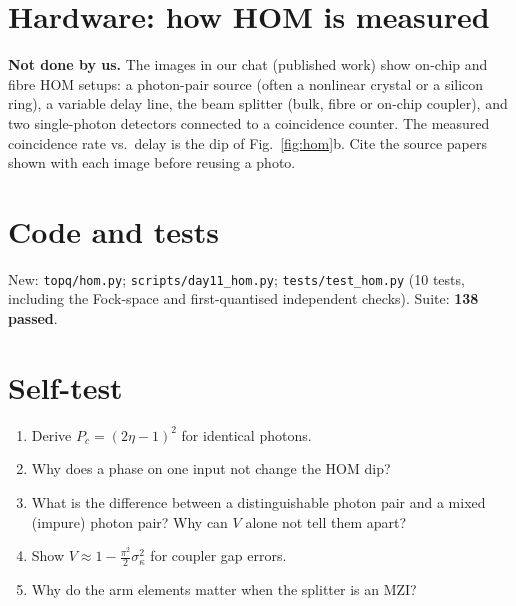 \documentclass[10pt,a4paper]{article}
\begin{document}
\section{Hardware: how HOM is measured}
\textbf{Not done by us.} The images in our chat (published work) show on-chip and fibre HOM setups: a photon-pair source (often a nonlinear crystal or a silicon ring), a variable delay line, the beam splitter (bulk, fibre or on-chip coupler), and two single-photon detectors connected to a coincidence counter. The measured coincidence rate vs.\ delay is the dip of Fig.~\ref{fig:hom}b. Cite the source papers shown with each image before reusing a photo.

\section{Code and tests}
New: \texttt{topq/hom.py}; \texttt{scripts/day11\_hom.py}; \texttt{tests/test\_hom.py} (10 tests, including the Fock-space and first-quantised independent checks). Suite: \textbf{138 passed}.

\section{Self-test}
\begin{enumerate}[itemsep=1pt]
\item Derive $P_c=(2\eta-1)^2$ for identical photons.
\item Why does a phase on one input not change the HOM dip?
\item What is the difference between a distinguishable photon pair and a mixed (impure) photon pair? Why can $V$ alone not tell them apart?
\item Show $V\approx1-\frac{\pi^2}{2}\sigma_\kappa^2$ for coupler gap errors.
\item Why do the arm elements matter when the splitter is an MZI?
\end{enumerate}
\end{document}
